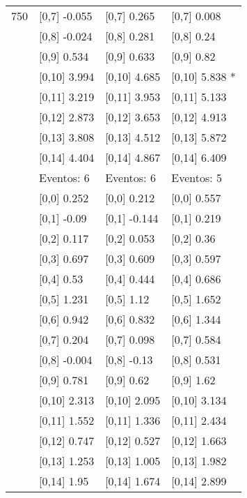 \begin{table}
\begin{tabular}[t]{llll}
750 & {}[0,7] -0.055 & {}[0,7] 0.265 & {}[0,7] 0.008\\
\addlinespace
 & {}[0,8] -0.024 & {}[0,8] 0.281 & {}[0,8] 0.24\\
 & {}[0,9] 0.534 & {}[0,9] 0.633 & {}[0,9] 0.82\\
 & {}[0,10] 3.994 & {}[0,10] 4.685 & {}[0,10] 5.838 *\\
 & {}[0,11] 3.219 & {}[0,11] 3.953 & {}[0,11] 5.133\\
 & {}[0,12] 2.873 & {}[0,12] 3.653 & {}[0,12] 4.913\\
\addlinespace
 & {}[0,13] 3.808 & {}[0,13] 4.512 & {}[0,13] 5.872\\
 & {}[0,14] 4.404 & {}[0,14] 4.867 & {}[0,14] 6.409\\
 & Eventos:  6 & Eventos:  6 & Eventos:  5\\
 & {}[0,0] 0.252 & {}[0,0] 0.212 & {}[0,0] 0.557\\
 & {}[0,1] -0.09 & {}[0,1] -0.144 & {}[0,1] 0.219\\
\addlinespace
 & {}[0,2] 0.117 & {}[0,2] 0.053 & {}[0,2] 0.36\\
 & {}[0,3] 0.697 & {}[0,3] 0.609 & {}[0,3] 0.597\\
 & {}[0,4] 0.53 & {}[0,4] 0.444 & {}[0,4] 0.686\\
 & {}[0,5] 1.231 & {}[0,5] 1.12 & {}[0,5] 1.652\\
 & {}[0,6] 0.942 & {}[0,6] 0.832 & {}[0,6] 1.344\\
\addlinespace
1000 & {}[0,7] 0.204 & {}[0,7] 0.098 & {}[0,7] 0.584\\
 & {}[0,8] -0.004 & {}[0,8] -0.13 & {}[0,8] 0.531\\
 & {}[0,9] 0.781 & {}[0,9] 0.62 & {}[0,9] 1.62\\
 & {}[0,10] 2.313 & {}[0,10] 2.095 & {}[0,10] 3.134\\
 & {}[0,11] 1.552 & {}[0,11] 1.336 & {}[0,11] 2.434\\
\addlinespace
 & {}[0,12] 0.747 & {}[0,12] 0.527 & {}[0,12] 1.663\\
 & {}[0,13] 1.253 & {}[0,13] 1.005 & {}[0,13] 1.982\\
 & {}[0,14] 1.95 & {}[0,14] 1.674 & {}[0,14] 2.899\\
\bottomrule
\end{tabular}
\end{table}
